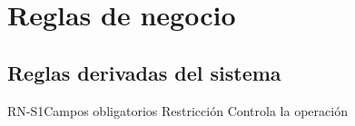 

\section{Reglas de negocio}

\subsection{Reglas derivadas del sistema}
\begin{BusinessRule}{RN-S1}{Campos obligatorios}
	{Restricción}
	{Controla la operación}
\end{BusinessRule}

